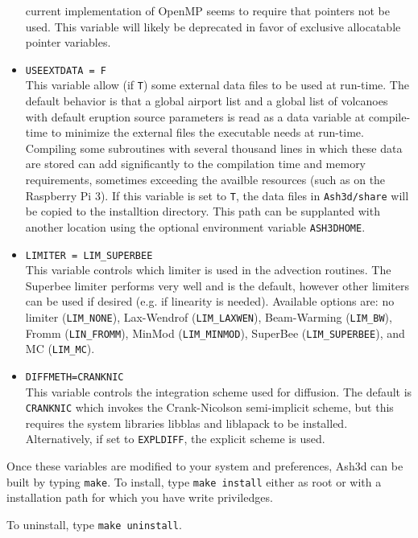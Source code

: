 \begin{itemize}
current implementation of OpenMP seems to require that pointers not be used.
This variable
will likely be deprecated in favor of exclusive allocatable pointer variables.
 \item \texttt{USEEXTDATA = F}\\
This variable allow (if \texttt{T}) some external data files to be used at run-time.
The default behavior is that a global airport list and a global list of volcanoes with
default eruption source parameters is read as a data variable at compile-time
to minimize the external files the executable needs at run-time.  Compiling
some subroutines with several thousand lines in which these data are stored can add
significantly to the compilation time and memory requirements, sometimes exceeding
the availble resources (such as on the Raspberry Pi 3).  If this variable is set to
\texttt{T}, the data files in \texttt{Ash3d/share} will be copied to the installtion
directory.  This path can be supplanted with another location using the optional
environment variable \texttt{ASH3DHOME}.
 \item \texttt{LIMITER = LIM\_SUPERBEE}\\
This variable controls which limiter is used in the advection routines.  The
Superbee limiter performs very well and is the default, however other limiters
can be used if desired (e.g. if linearity is needed).  Available options are:
no limiter (\texttt{LIM\_NONE}), Lax-Wendrof (\texttt{LIM\_LAXWEN}),
Beam-Warming (\texttt{LIM\_BW}), Fromm (\texttt{LIN\_FROMM}), 
MinMod (\texttt{LIM\_MINMOD}), SuperBee (\texttt{LIM\_SUPERBEE}),
and MC (\texttt{LIM\_MC}).
 \item \texttt{DIFFMETH=CRANKNIC}\\
This variable controls the integration scheme used for diffusion.  The default
is \texttt{CRANKNIC} which invokes the Crank-Nicolson semi-implicit scheme, but
this requires the  system libraries libblas and liblapack to be installed.
Alternatively, if set to \texttt{EXPLDIFF}, the explicit scheme is used.
\end{itemize}

Once these variables are modified to your system and preferences, Ash3d can
be built by typing \texttt{make}.  To install, type \texttt{make install}
either as root or with a installation path for which you have write
priviledges.

To uninstall, type \texttt{make uninstall}.
